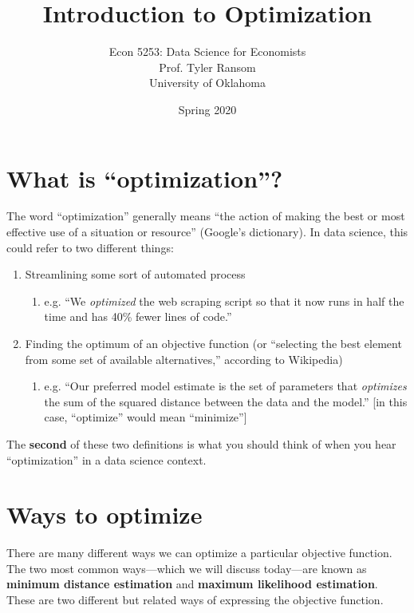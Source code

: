 \documentclass[12pt,english]{article}
\begin{document}
\title{Introduction to Optimization}
\author{Econ 5253: Data Science for Economists\\ Prof. Tyler Ransom\\ University of Oklahoma}
\date{Spring 2020}
\maketitle

\section{What is ``optimization''?}

The word ``optimization'' generally means ``the action of making the best or most effective use of a situation or resource'' (Google's dictionary). In data science, this could refer to two different things:
\begin{enumerate}
    \item Streamlining some sort of automated process
    \begin{enumerate}
        \item e.g. ``We \emph{optimized} the web scraping script so that it now runs in half the time and has 40\% fewer lines of code.''
    \end{enumerate}
    \item Finding the optimum of an objective function (or ``selecting the best element from some set of available alternatives,'' according to Wikipedia)
    \begin{enumerate}
        \item e.g. ``Our preferred model estimate is the set of parameters that \emph{optimizes} the sum of the squared distance between the data and the model.'' {[}in this case, ``optimize'' would mean ``minimize''{]}
    \end{enumerate}
\end{enumerate}
The \textbf{second} of these two definitions is what you should think of when you hear ``optimization'' in a data science context.

\section{Ways to optimize}
There are many different ways we can optimize a particular objective function. The two most common ways---which we will discuss today---are known as \textbf{minimum distance estimation} and \textbf{maximum likelihood estimation}. These are two different but related ways of expressing the objective function.
\end{document}
